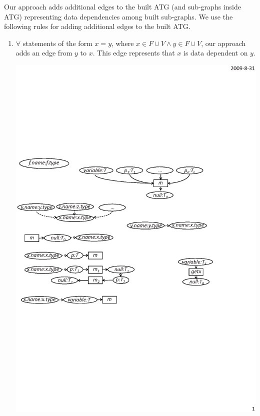 Our approach adds additional edges to the built ATG (and sub-graphs
inside ATG) representing data dependencies among built sub-graphs.
We use the following rules for adding additional edges to the built
ATG.  \vspace*{-1.5ex}
\begin{enumerate}
\item $\forall$ statements of the form $x = y$, where $x \in F \cup V \wedge y \in F \cup V$,
our approach adds an edge from $y$ to $x$. This edge represents that
$x$ is data dependent on $y$.\vspace*{-1.5ex}
\begin{center}
\includegraphics[scale=0.7,clip]{figure/rule4.eps}%

\end{center}
\end{enumerate}
